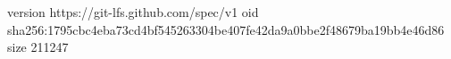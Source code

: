 version https://git-lfs.github.com/spec/v1
oid sha256:1795cbc4eba73cd4bf545263304be407fe42da9a0bbe2f48679ba19bb4e46d86
size 211247
